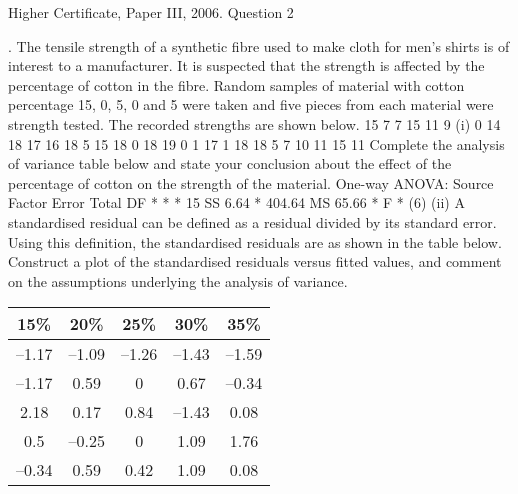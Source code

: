 \documentclass[a4paper,12pt]{article}
\begin{document}
Higher Certificate, Paper III, 2006. Question 2

\begin{framed}

.
The tensile strength of a synthetic fibre used to make cloth for men's shirts is of
interest to a manufacturer. It is suspected that the strength is affected by the
percentage of cotton in the fibre. Random samples of material with cotton percentage
15, 0, 5, 0 and 5 were taken and five pieces from each material were strength
tested. The recorded strengths are shown below.
15%
7
7
15
11
9
(i)
0%
14
18
17
16
18
5%
15
18
0
18
19
0%
1
17
1
18
18
5%
7
10
11
15
11
Complete the analysis of variance table below and state your conclusion about
the effect of the percentage of cotton on the strength of the material.
One-way ANOVA:
Source
Factor
Error
Total
DF
*
*
*
15%
SS
6.64
*
404.64
MS
65.66
*
F
*
(6)
(ii)
A standardised residual can be defined as a residual divided by its standard error. Using this definition, the standardised residuals are as shown in the table below. Construct a plot of the standardised residuals versus fitted values, and comment on the assumptions underlying the analysis of variance.
\begin{center}
\begin{tabular}{c|c|c|c|c|}
15\%	&	20\%	&	25\%	&	30\%	&	35\%	\\ \hline 
–1.17	&	–1.09	&	–1.26	&	–1.43	&	–1.59	\\ \hline 
–1.17	&	0.59	&	0	&	0.67	&	–0.34	\\ \hline 
2.18	&	0.17	&	0.84	&	–1.43	&	0.08	\\ \hline 
0.5	&	–0.25	&	0	&	1.09	&	1.76	\\ \hline 
–0.34	&	0.59	&	0.42	&	1.09	&	0.08	\\ \hline 
\end{tabular}
\end{center}


\end{framed}
\end{document}
